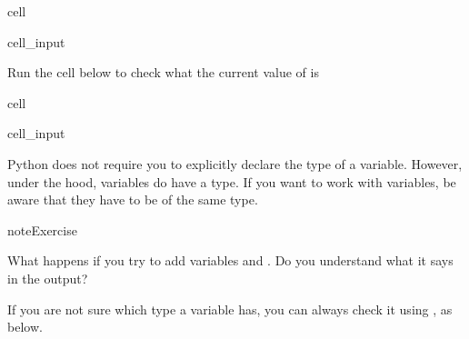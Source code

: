 \documentclass[letterpaper,10pt,english]{jupyterBook}
\begin{document}
\begin{sphinxuseclass}{cell}\begin{sphinxVerbatimInput}

\begin{sphinxuseclass}{cell_input}
\begin{sphinxVerbatim}[commandchars=\\\{\}]
    
\end{sphinxVerbatim}

\end{sphinxuseclass}\end{sphinxVerbatimInput}

\end{sphinxuseclass}
\sphinxAtStartPar
Run the cell below to check what the current value of  is

\begin{sphinxuseclass}{cell}\begin{sphinxVerbatimInput}

\begin{sphinxuseclass}{cell_input}
\begin{sphinxVerbatim}[commandchars=\\\{\}]
\end{sphinxVerbatim}

\end{sphinxuseclass}\end{sphinxVerbatimInput}

\end{sphinxuseclass}
\sphinxAtStartPar
Python does not require you to explicitly declare the type of a variable. However, under the hood, variables do have a type. If you want to work with variables, be aware that they have to be of the same type.

\begin{sphinxadmonition}{note}{Exercise}

\sphinxAtStartPar
What happens if you try to add variables  and . Do you understand what it says in the output?
\end{sphinxadmonition}

\sphinxAtStartPar
If you are not sure which type a variable has, you can always check it using , as below.
\end{document}
